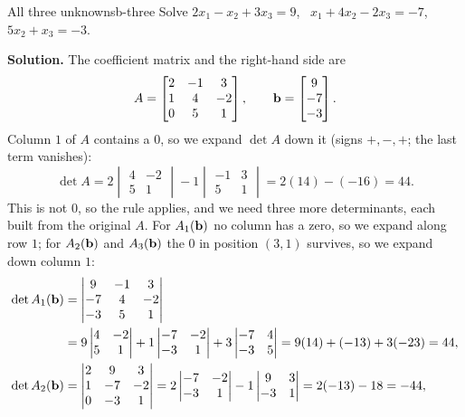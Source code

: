 \documentclass[11pt]{article}
\begin{document}
\begin{exmp}{All three unknowns}{b-three}
Solve $2x_1-x_2+3x_3=9$, \ $x_1+4x_2-2x_3=-7$, \ $5x_2+x_3=-3$.

\textbf{Solution.} The coefficient matrix and the right-hand side are
\[
A=\begin{bmatrix}2&-1&3\\1&4&-2\\0&5&1\end{bmatrix},\qquad\mathbf{b}=\begin{bmatrix}9\\-7\\-3\end{bmatrix}.
\]
Column $1$ of $A$ contains a $0$, so we expand $\det A$ down it (signs $+,-,+$; the last term vanishes):
\[
\det A=2\begin{vmatrix}4&-2\\5&1\end{vmatrix}-1\begin{vmatrix}-1&3\\5&1\end{vmatrix}=2(14)-(-16)=44.
\]
This is not $0$, so the rule applies, and we need three more determinants, each built from the original $A$. For $A_1(\mathbf{b})$ no column has a zero, so we expand along row $1$; for $A_2(\mathbf{b})$ and $A_3(\mathbf{b})$ the $0$ in position $(3,1)$ survives, so we expand down column $1$:
\begin{align*}
\det A_1(\bv{b})&=\begin{vmatrix}9&-1&3\\-7&4&-2\\-3&5&1\end{vmatrix}\\
&=9\begin{vmatrix}4&-2\\5&1\end{vmatrix}+1\begin{vmatrix}-7&-2\\-3&1\end{vmatrix}+3\begin{vmatrix}-7&4\\-3&5\end{vmatrix}=9(14)+(-13)+3(-23)=44,\\
\det A_2(\bv{b})&=\begin{vmatrix}2&9&3\\1&-7&-2\\0&-3&1\end{vmatrix}=2\begin{vmatrix}-7&-2\\-3&1\end{vmatrix}-1\begin{vmatrix}9&3\\-3&1\end{vmatrix}=2(-13)-18=-44,\\

\end{align*}
\end{exmp}
\end{document}
